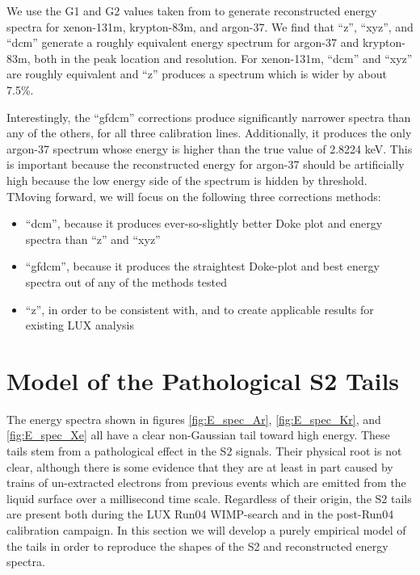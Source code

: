 We use the G1 and G2 values taken from to generate reconstructed energy spectra for xenon-131m, krypton-83m, and argon-37. We find that ``z'', ``xyz'', and ``dcm'' generate a roughly equivalent energy spectrum for argon-37 and krypton-83m, both in the peak location and resolution. For xenon-131m, ``dcm'' and ``xyz'' are roughly equivalent and ``z'' produces a spectrum which is wider by about 7.5\%. 

Interestingly, the ``gfdcm'' corrections produce significantly narrower spectra than any of the others, for all three calibration lines. Additionally, it produces the only argon-37 spectrum whose energy is higher than the true value of 2.8224 keV. This is important because the reconstructed energy for argon-37 should be artificially high because the low energy side of the spectrum is hidden by threshold. TMoving forward, we will focus on the following three corrections methods: 
\begin{itemize}
\item ``dcm'', because it produces ever-so-slightly better Doke plot and energy spectra than ``z'' and ``xyz''
\item ``gfdcm'', because it produces the straightest Doke-plot and best energy spectra out of any of the methods tested
\item ``z'', in order to be consistent with, and to create applicable results for existing LUX analysis
\end{itemize}



\section{Model of the Pathological S2 Tails}\label{sec:s2tails}
The energy spectra shown in figures \ref{fig:E_spec_Ar}, \ref{fig:E_spec_Kr}, and \ref{fig:E_spec_Xe} all have a clear non-Gaussian tail toward high energy. These tails stem from a pathological effect in the S2 signals. Their physical root is not clear, although there is some evidence that they are at least in part caused by trains of un-extracted electrons from previous events which are emitted from the liquid surface over a millisecond time scale. Regardless of their origin, the S2 tails are present both during the LUX Run04 WIMP-search and in the post-Run04 calibration campaign. In this section we will develop a purely empirical model of the tails in order to reproduce the shapes of the S2 and reconstructed energy spectra.

